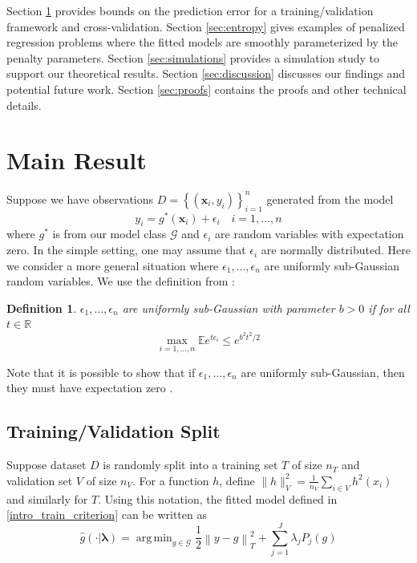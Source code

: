 \documentclass[12pt]{article}
\newtheorem{definition}{Definition}
\DeclareMathOperator*{\argmin}{arg\,min}
\begin{document}
Section \ref{sec:main_results} provides bounds on the prediction error for a training/validation framework and cross-validation.
Section \ref{sec:entropy} gives examples of penalized regression problems where the fitted models are smoothly parameterized by the penalty parameters.
Section \ref{sec:simulations} provides a simulation study to support our theoretical results.
Section \ref{sec:discussion} discusses our findings and potential future work.
Section \ref{sec:proofs} contains the proofs and other technical details.

\section{Main Result} \label{sec:main_results}

Suppose we have observations $D = \left \{ (\boldsymbol{x}_i, y_i) \right \}_{i=1}^n$ generated from the model
\begin{equation}
y_i = g^*(\boldsymbol x_i) + \epsilon_i \quad i=1,...,n
\end{equation}
where $g^*$ is from our model class $\mathcal{G}$ and $\epsilon_i$ are random variables with expectation zero. In the simple setting, one may assume that $\epsilon_i$ are normally distributed. Here we consider a more general situation where $\epsilon_1,...,\epsilon_n$ are uniformly sub-Gaussian random variables. We use the definition from \citep{Buldygin1980}:
\begin{definition}
	$\epsilon_1, ..., \epsilon_n$ are uniformly sub-Gaussian with parameter $b>0$ if for all $t \in \mathbb{R}$
	\begin{equation}
	\max_{i=1,...,n} \mathbb{E} e^{t \epsilon_i} \le e^{b^2t^2/2}
	\end{equation}
\end{definition}
Note that it is possible to show that if $\epsilon_1,...,\epsilon_n$ are uniformly sub-Gaussian, then they must have expectation zero \citep{stromberg1994probability}.

\subsection{Training/Validation Split}

Suppose dataset $D$ is randomly split into a training set $T$ of size $n_T$ and validation set $V$ of size $n_V$. For a function $h$, define $\| h \|_V^2 = \frac{1}{n_V}\sum_{i\in V} h^2(x_i)$ and similarly for $T$. Using this notation, the fitted model defined in  \eqref{intro_train_criterion} can be written as
\begin{equation}
\hat{g}(\cdot | \boldsymbol \lambda) = \argmin_{g\in \mathcal{G}} \frac{1}{2} \left \|y -  g \right \|_T^2 + \sum_{j=1}^J \lambda_j P_j(g)
\end{equation}
\end{document}
